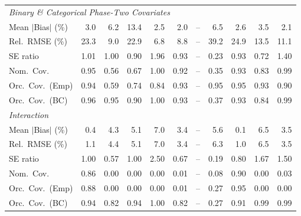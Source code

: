 \begin{table}[!htbp]
{\begin{tabular}{lrrrrrrrrrr}
\midrule
\multicolumn{11}{l}{\textit{Binary \& Categorical Phase-Two Covariates}} \\[2pt]
\quad Mean $|$Bias$|$ (\%) & 3.0 & 6.2 & 13.4 & \cellcolor{rankthree}2.5 & \cellcolor{rankone}2.0 & -- & 6.5 & 2.6 & 3.5 & \cellcolor{ranktwo}2.1 \\
\quad Rel.\ RMSE (\%) & 23.3 & \cellcolor{rankthree}9.0 & 22.9 & \cellcolor{rankone}6.8 & \cellcolor{ranktwo}8.8 & -- & 39.2 & 24.9 & 13.5 & 11.1 \\
\quad SE ratio & \cellcolor{ranktwo}1.01 & \cellcolor{rankone}1.00 & 0.90 & 1.96 & \cellcolor{rankthree}0.93 & -- & 0.23 & \cellcolor{rankthree}0.93 & 0.72 & 1.40 \\
\quad Nom.\ Cov. & \cellcolor{rankone}0.95 & 0.56 & 0.67 & 1.00 & \cellcolor{rankthree}0.92 & -- & 0.35 & \cellcolor{ranktwo}0.93 & 0.83 & 0.99 \\
\quad Orc.\ Cov.\ (Emp) & \cellcolor{ranktwo}0.94 & 0.59 & 0.74 & 0.84 & \cellcolor{rankthree}0.93 & -- & \cellcolor{rankone}0.95 & \cellcolor{rankone}0.95 & \cellcolor{rankthree}0.93 & 0.90 \\
\quad Orc.\ Cov.\ (BC) & \cellcolor{ranktwo}0.96 & \cellcolor{rankone}0.95 & 0.90 & 1.00 & \cellcolor{rankthree}0.93 & -- & 0.37 & \cellcolor{rankthree}0.93 & 0.84 & 0.99 \\
\midrule
\multicolumn{11}{l}{\textit{Interaction}} \\[2pt]
\quad Mean $|$Bias$|$ (\%) & \cellcolor{ranktwo}0.4 & 4.3 & 5.1 & 7.0 & \cellcolor{rankthree}3.4 & -- & 5.6 & \cellcolor{rankone}0.1 & 6.5 & 3.5 \\
\quad Rel.\ RMSE (\%) & \cellcolor{ranktwo}1.1 & 4.4 & 5.1 & 7.0 & \cellcolor{rankthree}3.4 & -- & 6.3 & \cellcolor{rankone}1.0 & 6.5 & 3.5 \\
\quad SE ratio & \cellcolor{rankone}1.00 & 0.57 & \cellcolor{rankone}1.00 & 2.50 & \cellcolor{rankthree}0.67 & -- & 0.19 & \cellcolor{ranktwo}0.80 & 1.67 & 1.50 \\
\quad Nom.\ Cov. & \cellcolor{ranktwo}0.86 & 0.00 & 0.00 & 0.00 & 0.01 & -- & \cellcolor{rankthree}0.08 & \cellcolor{rankone}0.90 & 0.00 & 0.03 \\
\quad Orc.\ Cov.\ (Emp) & \cellcolor{ranktwo}0.88 & 0.00 & 0.00 & 0.00 & 0.01 & -- & \cellcolor{rankthree}0.27 & \cellcolor{rankone}0.95 & 0.00 & 0.00 \\
\quad Orc.\ Cov.\ (BC) & \cellcolor{rankone}0.94 & 0.82 & \cellcolor{rankone}0.94 & \cellcolor{rankthree}1.00 & 0.82 & -- & 0.27 & \cellcolor{ranktwo}0.91 & \cellcolor{ranktwo}0.99 & \cellcolor{ranktwo}0.99 \\
\bottomrule
\end{tabular}}
\end{table}

